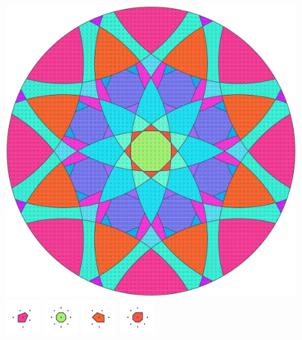 \documentclass[text.tex]{subfiles}
\begin{document}
\clearpage
\pagestyle{fancy}
\fancyhf{}
\begin{figure}[h!]
\centering
\includegraphics[width=1\textwidth]{img/results/circle8/circle8_116260_(-4522_1875alpha_4).pdf}
\includegraphics[width=0.12\textwidth]{img/results/circle8/circle8_116260_(-4522_1875alpha_4)_001.pdf}
\includegraphics[width=0.12\textwidth]{img/results/circle8/circle8_116260_(-4522_1875alpha_4)_002.pdf}
\includegraphics[width=0.12\textwidth]{img/results/circle8/circle8_116260_(-4522_1875alpha_4)_003.pdf}
\includegraphics[width=0.12\textwidth]{img/results/circle8/circle8_116260_(-4522_1875alpha_4)_004.pdf}

\end{figure}
\end{document}
